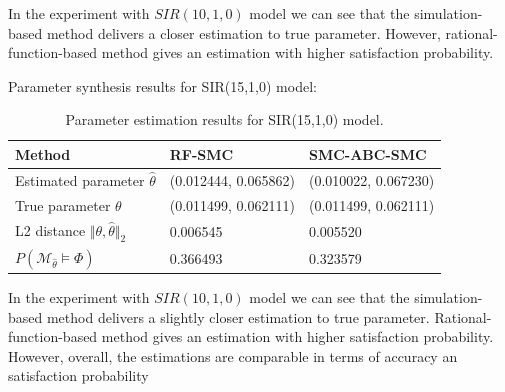 In the experiment with $SIR(10,1,0)$ model we can see that the simulation-based method delivers a
closer estimation to true parameter. However, rational-function-based method gives an estimation
with higher satisfaction probability.

\newpage
\noindent Parameter synthesis results for SIR(15,1,0) model:
\begin{table}[H]
    \begin{tabular}{|l|l|l|}
        \hline
        Method                                           & RF-SMC               & SMC-ABC-SMC          \\ \hline
        Estimated parameter $\hat{\theta}$               & (0.012444, 0.065862) & (0.010022, 0.067230) \\ \hline
        True parameter $\theta$                          & (0.011499, 0.062111) & (0.011499, 0.062111) \\ \hline
        L2 distance $\Vert \theta, \hat{\theta} \Vert_2$ & 0.006545             & 0.005520             \\ \hline
        $P(\mathcal{M}_{\hat{\theta}}\models\Phi)$       & 0.366493             & 0.323579             \\ \hline
    \end{tabular}
    \caption{Parameter estimation results for SIR(15,1,0) model.}
\end{table}
In the experiment with $SIR(10,1,0)$ model we can see that the simulation-based method delivers a
slightly closer estimation to true parameter. Rational-function-based method gives an estimation
with higher satisfaction probability. However, overall, the estimations are comparable in terms of
accuracy an satisfaction probability

